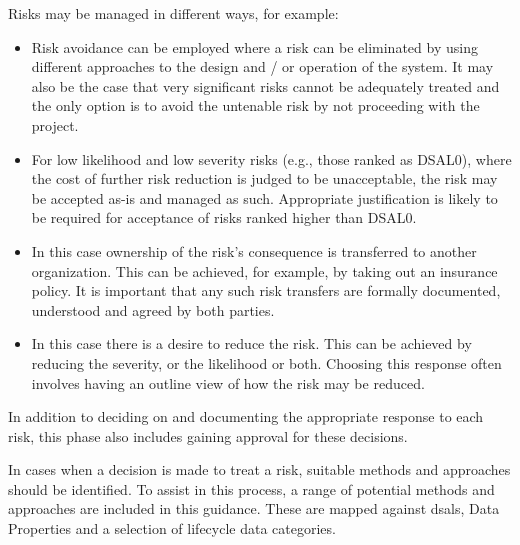 Risks may be managed in different ways, for example:

\begin{itemize}
  \item {}
	
	Risk avoidance can be employed where a risk can be eliminated by using different approaches to the design and / or operation of the system. It may also be the case that very significant risks cannot be adequately treated and the only option is to avoid the untenable risk by not proceeding with the project.

  \item {} 
	
    For low likelihood and low severity risks (e.g., those ranked as DSAL0), where the cost of further risk reduction is judged to be unacceptable, the risk may be accepted as-is and managed as such. Appropriate justification is likely to be required for acceptance of risks ranked higher than DSAL0.
\clearpage   
  \item {} 
	
	In this case ownership of the risk's consequence is transferred to another organization. This can be achieved, for example, by taking out an insurance policy. It is important that any such risk transfers are formally documented, understood and
	agreed
	by both parties.

  \item {} 
	
	In this case there is a desire to reduce the risk. This can be achieved by reducing the severity, or the likelihood or both. Choosing this response often involves having an outline view of how the risk may be reduced. 
\end{itemize}

In addition to deciding on and documenting the appropriate response to each risk, this phase also includes gaining approval for these decisions.

In cases when a decision is made to treat a risk, suitable methods and approaches should be identified. To assist in this process, a range of potential methods and approaches are included in this guidance. These are mapped against \glspl{dsal}, Data Properties and a selection of lifecycle data categories.

